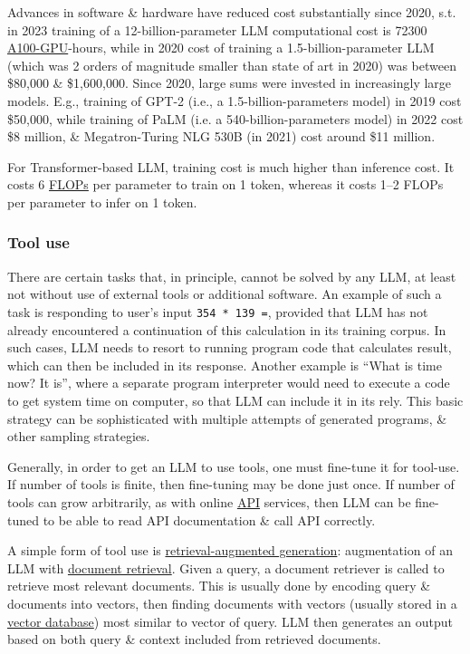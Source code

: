\documentclass{article}
\begin{document}
Advances in software \& hardware have reduced cost substantially since 2020, s.t. in 2023 training of a 12-billion-parameter LLM computational cost is 72300 \href{https://en.wikipedia.org/wiki/Ampere_(microarchitecture)}{A100-GPU}-hours, while in 2020 cost of training a 1.5-billion-parameter LLM (which was 2 orders of magnitude smaller than state of art in 2020) was between \$80,000 \& \$1,600,000. Since 2020, large sums were invested in increasingly large models. E.g., training of GPT-2 (i.e., a 1.5-billion-parameters model) in 2019 cost \$50,000, while training of PaLM (i.e. a 540-billion-parameters model) in 2022 cost \$8 million, \& Megatron-Turing NLG 530B (in 2021) cost around \$11 million.

For Transformer-based LLM, training cost is much higher than inference cost. It costs 6 \href{https://en.wikipedia.org/wiki/FLOPS}{FLOPs} per parameter to train on 1 token, whereas it costs 1--2 FLOPs per parameter to infer on 1 token.

\subsubsection{Tool use}
There are certain tasks that, in principle, cannot be solved by any LLM, at least not without use of external tools or additional software. An example of such a task is responding to user's input \verb|354 * 139 =|, provided that LLM has not already encountered a continuation of this calculation in its training corpus. In such cases, LLM needs to resort to running program code that calculates result, which can then be included in its response. Another example is ``What is time now? It is'', where a separate program interpreter would need to execute a code to get system time on computer, so that LLM can include it in its rely. This basic strategy can be sophisticated with multiple attempts of generated programs, \& other sampling strategies.

Generally, in order to get an LLM to use tools, one must fine-tune it for tool-use. If number of tools is finite, then fine-tuning may be done just once. If number of tools can grow arbitrarily, as with online \href{https://en.wikipedia.org/wiki/API}{API} services, then LLM can be fine-tuned to be able to read API documentation \& call API correctly.

A simple form of tool use is \href{https://en.wikipedia.org/wiki/Retrieval-augmented_generation}{retrieval-augmented generation}: augmentation of an LLM with \href{https://en.wikipedia.org/wiki/Document_retrieval}{document retrieval}. Given a query, a document retriever is called to retrieve most relevant documents. This is usually done by encoding query \& documents into vectors, then finding documents with vectors (usually stored in a \href{https://en.wikipedia.org/wiki/Vector_database}{vector database}) most similar to vector of query. LLM then generates an output based on both query \& context included from retrieved documents.
\end{document}
